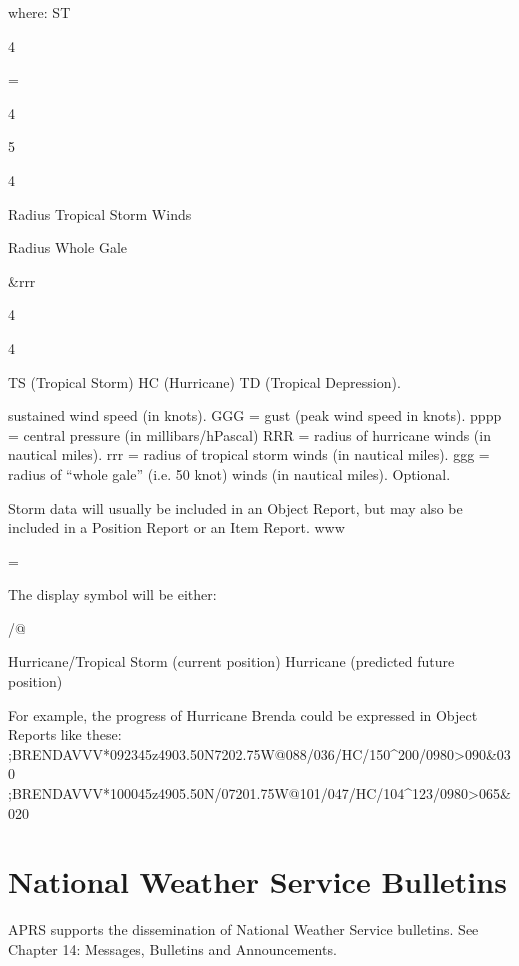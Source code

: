 \begin {description}
where: ST

4

=

4

5

4

Radius
Tropical
Storm
Winds

Radius
Whole
Gale

&rrr


4

4

TS (Tropical Storm)
HC (Hurricane)
TD (Tropical Depression).

sustained wind speed (in knots).
GGG = gust (peak wind speed in knots).
pppp = central pressure (in millibars/hPascal)
RRR = radius of hurricane winds (in nautical miles).
rrr = radius of tropical storm winds (in nautical miles).
ggg = radius of “whole gale” (i.e. 50 knot) winds (in
nautical miles). Optional.

\end{description}

Storm data will usually be included in an Object Report, but may also be
included in a Position Report or an Item Report.
www

=

The display symbol will be either:

\begin{description}
\@
/@

Hurricane/Tropical Storm (current position)
Hurricane (predicted future position)

\end{description}

For example, the progress of Hurricane Brenda could be expressed in Object
Reports like these:
;BRENDAVVV*092345z4903.50N\07202.75W@088/036/HC/150^200/0980>090&030%
;BRENDAVVV*100045z4905.50N/07201.75W@101/047/HC/104^123/0980>065&020%


\section {National Weather Service Bulletins}

APRS supports the dissemination of National Weather Service bulletins. See
Chapter 14: Messages, Bulletins and Announcements.



